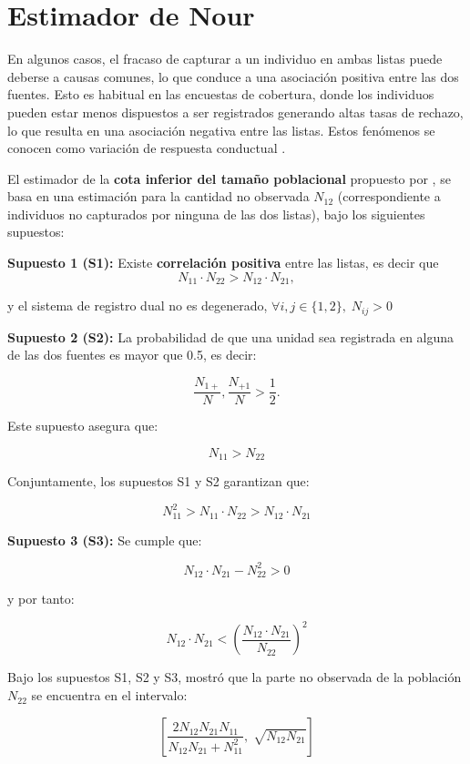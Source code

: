 \documentclass[
  12pt,
]{book}
\begin{document}
\section{Estimador de Nour}\label{estimador-de-nour}

En algunos casos, el fracaso de capturar a un individuo en ambas listas puede deberse a causas comunes, lo que conduce a una asociación positiva entre las dos fuentes. Esto es habitual en las encuestas de cobertura, donde los individuos pueden estar menos dispuestos a ser registrados generando altas tasas de rechazo, lo que resulta en una asociación negativa entre las listas. Estos fenómenos se conocen como variación de respuesta conductual \citep{wolter1986coverage} .

El estimador de la \textbf{cota inferior del tamaño poblacional} propuesto por \citet{nour1982estimation}, se basa en una estimación para la cantidad no observada \(N_{12}\) (correspondiente a individuos no capturados por ninguna de las dos listas), bajo los siguientes supuestos:

\textbf{Supuesto 1 (S1):} Existe \textbf{correlación positiva} entre las listas, es decir que \[N_{11} \cdot N_{22} > N_{12} \cdot N_{21},\]

y el sistema de registro dual no es degenerado, \(\forall i, j \in \{1, 2\}, \; N_{ij} > 0\)

\textbf{Supuesto 2 (S2):} La probabilidad de que una unidad sea registrada en alguna de las dos fuentes es mayor que 0.5, es decir:

\[\frac{N_{1+}}{N}, \frac{N_{+1}}{N} > \frac{1}{2}.\]

Este supuesto asegura que:

\[N_{11} > N_{22}\]

Conjuntamente, los supuestos S1 y S2 garantizan que:

\[N_{11}^2 > N_{11} \cdot N_{22} > N_{12} \cdot N_{21}\]

\textbf{Supuesto 3 (S3):} Se cumple que:

\[N_{12} \cdot N_{21} - N_{22}^2 > 0\]

y por tanto:

\[N_{12} \cdot N_{21} < \left( \frac{N_{12} \cdot N_{21}}{N_{22}} \right)^2\]

Bajo los supuestos S1, S2 y S3, \citet{nour1982estimation} mostró que la parte no observada de la población \(N_{22}\) se encuentra en el intervalo:

\[\left[ \frac{2 N_{12} N_{21} N_{11}}{N_{12} N_{21} + N_{11}^2}, \; \sqrt{N_{12} N_{21}} \right]\]
\end{document}
